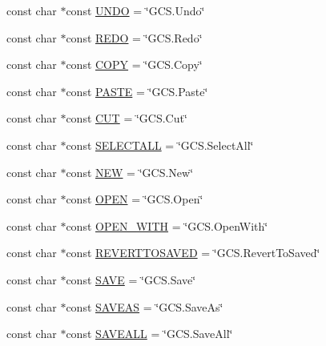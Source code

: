 \begin{DoxyCompactItemize}
\item 
const char $\ast$const \hyperlink{group___core_plugin_ga34ddc9153ce99ae69ebbe146e121719f}{\-U\-N\-D\-O} = \char`\"{}\-G\-C\-S.\-Undo\char`\"{}
\item 
const char $\ast$const \hyperlink{group___core_plugin_ga9daeef790ade4478da4320d3fd006532}{\-R\-E\-D\-O} = \char`\"{}\-G\-C\-S.\-Redo\char`\"{}
\item 
const char $\ast$const \hyperlink{group___core_plugin_gaa1db11f59291095e04627940894961fc}{\-C\-O\-P\-Y} = \char`\"{}\-G\-C\-S.\-Copy\char`\"{}
\item 
const char $\ast$const \hyperlink{group___core_plugin_ga1fea14e3f4d0203c54ff91a495a3cc6b}{\-P\-A\-S\-T\-E} = \char`\"{}\-G\-C\-S.\-Paste\char`\"{}
\item 
const char $\ast$const \hyperlink{group___core_plugin_ga81faf7dc9520b27201aca63aa91304ba}{\-C\-U\-T} = \char`\"{}\-G\-C\-S.\-Cut\char`\"{}
\item 
const char $\ast$const \hyperlink{group___core_plugin_ga088348a7f32fe0a36bc24dfb67dfbdab}{\-S\-E\-L\-E\-C\-T\-A\-L\-L} = \char`\"{}\-G\-C\-S.\-Select\-All\char`\"{}
\item 
const char $\ast$const \hyperlink{group___core_plugin_ga9dd395d533e9222eaf46cbd786386c6d}{\-N\-E\-W} = \char`\"{}\-G\-C\-S.\-New\char`\"{}
\item 
const char $\ast$const \hyperlink{group___core_plugin_ga9c2bccd3a88aafefdd2327622cb47a73}{\-O\-P\-E\-N} = \char`\"{}\-G\-C\-S.\-Open\char`\"{}
\item 
const char $\ast$const \hyperlink{group___core_plugin_gaead1f37ead69aad73333544a537be09b}{\-O\-P\-E\-N\-\_\-\-W\-I\-T\-H} = \char`\"{}\-G\-C\-S.\-Open\-With\char`\"{}
\item 
const char $\ast$const \hyperlink{group___core_plugin_gab887a9b6e7f92df3ecb462f16052e0ae}{\-R\-E\-V\-E\-R\-T\-T\-O\-S\-A\-V\-E\-D} = \char`\"{}\-G\-C\-S.\-Revert\-To\-Saved\char`\"{}
\item 
const char $\ast$const \hyperlink{group___core_plugin_ga86ee3b2c1b2de5786a3f7bc6b5a253e7}{\-S\-A\-V\-E} = \char`\"{}\-G\-C\-S.\-Save\char`\"{}
\item 
const char $\ast$const \hyperlink{group___core_plugin_gaa13d26deceb0015f1a40623ffd6c3e54}{\-S\-A\-V\-E\-A\-S} = \char`\"{}\-G\-C\-S.\-Save\-As\char`\"{}
\item 
const char $\ast$const \hyperlink{group___core_plugin_ga79482639b023a73967e432824a1746da}{\-S\-A\-V\-E\-A\-L\-L} = \char`\"{}\-G\-C\-S.\-Save\-All\char`\"{}
\item 

\end{DoxyCompactItemize}
